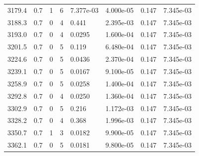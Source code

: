 \documentclass[preview]{standalone}
\begin{document}
{{{{{{{{\begin{tabular}{L{1.2cm}C{1.2cm} C{0.3cm}C{0.5cm} C{1.4cm}C{1.4cm} C{1.4cm}C{1.4cm}}
  3179.4  &   0.7  & 1     &  6 &  7.377e-03  & 4.000e-05  & 0.147 &  7.345e-03   \\ 
  3188.3  &   0.7  & 0     &  4 &  0.441  & 2.395e-03  & 0.147 &  7.345e-03   \\ 
  3193.0  &   0.7  & 0     &  4 &  0.0295  & 1.600e-04  & 0.147 &  7.345e-03   \\ 
  3201.5  &   0.7  & 0     &  5 &  0.119  & 6.480e-04  & 0.147 &  7.345e-03   \\ 
  3224.6  &   0.7  & 0     &  5 &  0.0436  & 2.370e-04  & 0.147 &  7.345e-03   \\ 
  3239.1  &   0.7  & 0     &  5 &  0.0167  & 9.100e-05  & 0.147 &  7.345e-03   \\ 
  3258.9  &   0.7  & 0     &  5 &  0.0258  & 1.400e-04  & 0.147 &  7.345e-03   \\ 
  3292.8  &   0.7  & 0     &  4 &  0.0250  & 1.360e-04  & 0.147 &  7.345e-03   \\ 
  3302.9  &   0.7  & 0     &  5 &  0.216  & 1.172e-03  & 0.147 &  7.345e-03   \\ 
  3328.2  &   0.7  & 0     &  4 &  0.368  & 1.996e-03  & 0.147 &  7.345e-03   \\ 
  3350.7  &   0.7  & 1     &  3 &  0.0182  & 9.900e-05  & 0.147 &  7.345e-03   \\ 
  3362.1  &   0.7  & 0     &  5 &  0.0181  & 9.800e-05  & 0.147 &  7.345e-03   \\ 
\hline 
\end{tabular} 

}}}}}}}}
\end{document}
